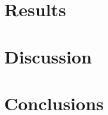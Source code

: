 \documentclass[a4paper, 12pt, openany, oneside]{book} %
\begin{document}
\chapter{Results}
\label{chap:results}

\cleardoublepage


\chapter{Discussion}

\cleardoublepage


\chapter{Conclusions}

\cleardoublepage


\printbibliography[title={References}] %
\cleardoublepage


\appendix

\fancyhf{} %
\renewcommand{\headrulewidth}{0pt} %
\fancyfoot[C]{\thepage} %

\setcounter{page}{1}

\renewcommand{\thechapter}{\Alph{chapter} -}
\renewcommand{\thesection}{\Alph{chapter}.\arabic{section}}



 
\end{document}
